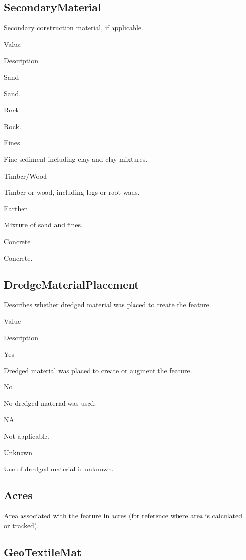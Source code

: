 \documentclass[
  letterpaper,
  DIV=11,
  numbers=noendperiod]{scrreprt}
\begin{document}
\subsection{SecondaryMaterial}\label{secondarymaterial-2}

Secondary construction material, if applicable.

Value

Description

Sand

Sand.

Rock

Rock.

Fines

Fine sediment including clay and clay mixtures.

Timber/Wood

Timber or wood, including logs or root wads.

Earthen

Mixture of sand and fines.

Concrete

Concrete.

\subsection{DredgeMaterialPlacement}\label{dredgematerialplacement-2}

Describes whether dredged material was placed to create the feature.

Value

Description

Yes

Dredged material was placed to create or augment the feature.

No

No dredged material was used.

NA

Not applicable.

Unknown

Use of dredged material is unknown.

\subsection{Acres}\label{acres-3}

Area associated with the feature in acres (for reference where area is
calculated or tracked).

\subsection{GeoTextileMat}\label{geotextilemat-1}
\end{document}
